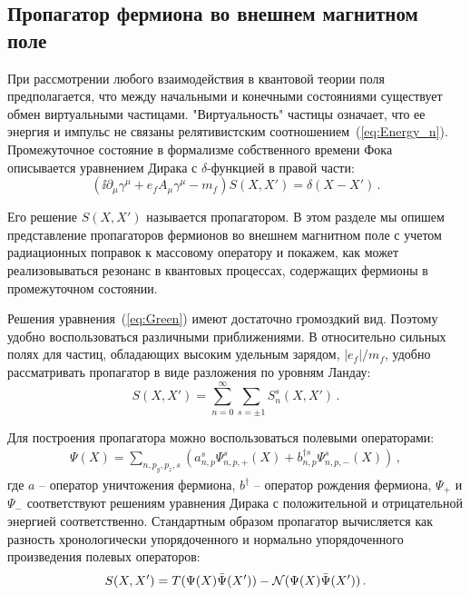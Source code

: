 \subsection{Пропагатор фермиона во внешнем магнитном поле}
При рассмотрении любого взаимодействия в квантовой теории поля предполагается, что между начальными и конечными состояниями существует обмен виртуальными частицами. "Виртуальность" частицы означает, что ее энергия и импульс не связаны релятивистским соотношением~(\ref{eq:Energy_n}). Промежуточное состояние в формализме собственного времени Фока~\cite{Schwinger:1951} описывается уравнением Дирака с $\delta$-функцией в правой части:
%
\begin{equation}\label{eq:Green}
(\ii\partial_\mu \gamma^\mu + e_f A_\mu \gamma^\mu - m_f) S(X,X')=\delta\left(X-X'\right)\, .
\end{equation}
%

Его решение $S(X,X')$ называется пропагатором. В этом разделе мы опишем представление пропагаторов фермионов во внешнем магнитном поле с учетом радиационных поправок к массовому оператору и покажем, как может реализовываться резонанс в квантовых процессах, содержащих фермионы в промежуточном состоянии.

Решения уравнения~(\ref{eq:Green}) имеют достаточно громоздкий вид. Поэтому удобно воспользоваться различными приближениями. В относительно сильных полях для частиц, обладающих высоким удельным зарядом, $|e_f|/m_f$, удобно рассматривать пропагатор в виде разложения по уровням Ландау:
\begin{equation}
	S(X,X') = \sum_{n=0}^{\infty}\sum_{s=\pm 1} S_n^s (X,X')\, .
\end{equation}

Для построения пропагатора можно воспользоваться полевыми операторами:
%
\begin{eqnarray}
\Psi (X) = \sum\limits_{n,p_y,p_z,s} ( a^{s}_{n,p} \Psi_{n,p,+}^s (X) + b^{\dagger s}_{n,p} \Psi_{n,p,-}^s (X) )\,,
\end{eqnarray}
\noindent где $a$ -- оператор уничтожения фермиона, $b^{\dagger}$ -- оператор рождения фермиона, $\Psi_{+}$ и $\Psi_{-}$ соответствуют решениям уравнения Дирака с положительной и отрицательной энергией соответственно. Стандартным образом пропагатор вычисляется как разность хронологически упорядоченного и нормально упорядоченного произведения полевых операторов:%
%
\begin{equation}
S(X,X') = T(\Psi(X)\bar{\Psi}(X')) - {\cal N}(\Psi(X)\bar{\Psi}(X'))\, .
\end{equation}
%

